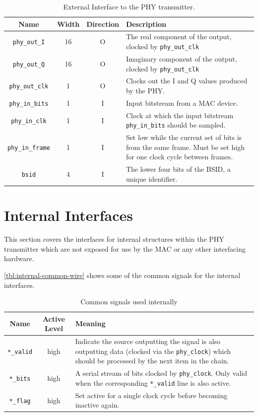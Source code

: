 \documentclass[dvips,10pt,twocolumn]{article}
\newcommand{\wire}{\texttt}
\begin{document}
\begin{table} \begin{tabularx}{\textwidth}{c|c|c|X}
	\label{tbl:extern-io}
	Name & Width & Direction & Description\\ \hline

	\wire{phy\_out\_I} & 16 & O & The real component of the output,
	clocked by \wire{phy\_out\_clk} \\

	\wire{phy\_out\_Q} & 16 & O & Imaginary component of the output,
	clocked by \wire{phy\_out\_clk} \\

	\wire{phy\_out\_clk} & 1 & O & Clocks out the I and Q values
	produced by the PHY. \\

	\wire{phy\_in\_bits} & 1 & I & Input bitstream from a MAC
	device. \\

	\wire{phy\_in\_clk} & 1 & I & Clock at which the input bitstream
	\wire{phy\_in\_bits} should be sampled. \\

	\wire{phy\_in\_frame} & 1 & I & Set low while the current set of
	bits is from the same frame. Must be set high for one clock cycle
	between frames. \\

	\wire{bsid} & 4 & I & The lower four bits of the BSID, a unique
	identifier.
\end{tabularx}
\caption{External Interface to the PHY transmitter.}
\end{table}

\section{Internal Interfaces}
This section covers the interfaces for internal structures within the PHY
transmitter which are not exposed for use by the MAC or any other interfacing
hardware.

\autoref{tbl:internal-common-wire} shows some of the common signals for
the internal interfaces.

\begin{table}
\begin{tabulary}{\textwidth}{c|C|L}
	\label{tbl:internal-common-wire}
	Name & Active Level & Meaning \\ \hline
	
	\wire{*\_valid} & high & Indicate the source outputting the signal
	is also outputting data (clocked via the \wire{phy\_clock}) which
	should be processed by the next item in the chain. \\

	\wire{*\_bits} & high & A serial stream of bits clocked by
	\wire{phy\_clock}. Only valid when the corresponding
	\wire{*\_valid} line is also active. \\

	\wire{*\_flag} & high & Set active for a single clock cycle
	before becoming inactive again.
\end{tabulary}
\caption{Common signals used internally}
\end{table}
\end{document}
